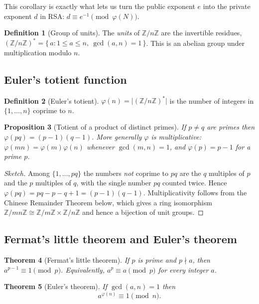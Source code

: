 \documentclass[11pt]{article}
\theoremstyle{plain}
\newtheorem{theorem}{Theorem}[section]
\newtheorem{proposition}[theorem]{Proposition}
\theoremstyle{definition}
\newtheorem{definition}[theorem]{Definition}
\theoremstyle{remark}
\newcommand{\Z}{\mathbb{Z}}
\newcommand{\Zn}{(\Z/n\Z)^{\!*}}
\begin{document}
This corollary is exactly what lets us turn the public exponent $e$ into the private
exponent $d$ in RSA: $d \equiv e^{-1} \pmod{\varphi(N)}$.

\begin{definition}[Group of units]
The \emph{units} of $\Z/n\Z$ are the invertible residues,
$\Zn = \{\, a : 1\le a\le n,\ \gcd(a,n)=1 \,\}$.
This is an abelian group under multiplication modulo $n$.
\end{definition}

\subsection{Euler's totient function}

\begin{definition}[Euler's totient]
$\varphi(n) = \bigl|\Zn\bigr|$ is the number of integers in $\{1,\dots,n\}$ coprime
to $n$.
\end{definition}

\begin{proposition}[Totient of a product of distinct primes]\label{prop:phi}
If $p\neq q$ are primes then $\varphi(pq) = (p-1)(q-1)$. More generally $\varphi$ is
\emph{multiplicative}: $\varphi(mn)=\varphi(m)\varphi(n)$ whenever $\gcd(m,n)=1$, and
$\varphi(p)=p-1$ for a prime $p$.
\end{proposition}

\begin{proof}[Sketch]
Among $\{1,\dots,pq\}$ the numbers \emph{not} coprime to $pq$ are the $q$ multiples of
$p$ and the $p$ multiples of $q$, with the single number $pq$ counted twice. Hence
$\varphi(pq)=pq-p-q+1=(p-1)(q-1)$. Multiplicativity follows from the Chinese Remainder
Theorem below, which gives a ring isomorphism
$\Z/mn\Z\cong \Z/m\Z\times\Z/n\Z$ and hence a bijection of unit groups.
\end{proof}

\subsection{Fermat's little theorem and Euler's theorem}

\begin{theorem}[Fermat's little theorem]\label{thm:fermat}
If $p$ is prime and $p\nmid a$, then $a^{p-1}\equiv 1 \pmod p$. Equivalently,
$a^{p}\equiv a \pmod p$ for \emph{every} integer $a$.
\end{theorem}

\begin{theorem}[Euler's theorem]\label{thm:euler}
If $\gcd(a,n)=1$ then
\[
  a^{\varphi(n)} \equiv 1 \pmod n .
\]
\end{theorem}
\end{document}
